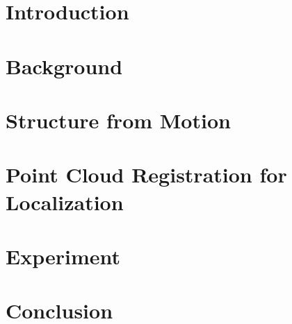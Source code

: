 \documentclass[11pt]{report}
\begin{document}
    
    \newpage

    

    \newpage
    \tableofcontents

    \newpage
    \chapter{Introduction}
    

    \newpage
    \chapter{Background}
    \label{chap:background}
    

    \newpage
    \chapter{Structure from Motion}
    \label{chap:sfm}
    

    \newpage
    \chapter{Point Cloud Registration for Localization}
    \label{chap:reg}
    

    \newpage
    \chapter{Experiment}
    \label{chap:experiment}
    

    \newpage
    \chapter{Conclusion}
    \label{chap:conclusion}
    

    
    
    
\end{document}
